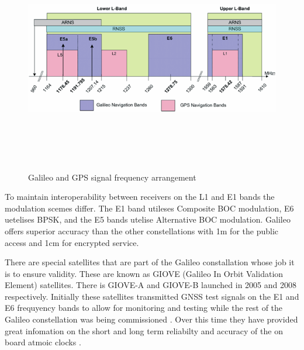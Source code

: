 \begin{figure}[h]
    \begin{centering}
        \includegraphics[width=14cm,height=10cm,keepaspectratio]{Figures/Galileo_Frequency_Plan.png}
        \caption{Galileo and GPS signal frequency arrangement}
        \label{fig:SignalPlan}
    \end{centering}
\end{figure}

To maintain interoperability between receivers on the L1 and E1 bands the modulation scemes differ.
The E1 band utileses Composite BOC modulation, E6 uetelises BPSK, and the E5 bands utelise Alternative BOC modulation.
Galileo offers superior accuracy than the other constellations with 1m for the public access and 1cm for encrypted service.

There are special satellites that are part of the Galileo constallation whose job it is to ensure validity. These are known as GIOVE (Galileo In Orbit Validation Element)
satellites. There is GIOVE-A and GIOVE-B launched in 2005 and 2008 respectively. Initially these satellites transmitted GNSS test signals on the E1 and E6 frequyency
bands to allow for monitoring and testing while the rest of the Galileo constellation was being commissioned \cite{RN65}. Over this time they have provided great infomation on the
short and long term reliabilty and accuracy of the on board atmoic clocks \cite{RN66}.


